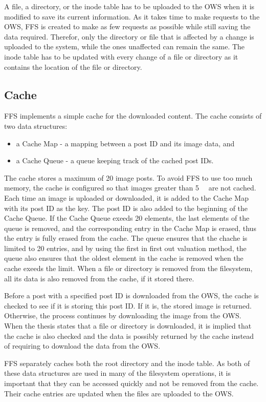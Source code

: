 A file, a directory, or the inode table has to be uploaded to the OWS when it is modified to save its current information. As it takes time to make requests to the OWS, FFS is created to make as few requests as possible while still saving the data required. Therefor, only the directory or file that is affected by a change is uploaded to the system, while the ones unaffected can remain the same. The inode table has to be updated with every change of a file or directory as it contains the location of the file or directory.

\subsection{Cache}
FFS implements a simple cache for the downloaded content. The cache consists of two data structures: 
\begin{itemize}
	\item a Cache Map - a mapping between a post ID and its image data, and
	\item a Cache Queue - a queue keeping track of the cached post IDs.
\end{itemize}
The cache stores a maximum of 20 image posts. To avoid FFS to use too much memory, the cache is configured so that images greater than \SI{5}{\mega\byte} are not cached. Each time an image is uploaded or downloaded, it is added to the Cache Map with its post ID as the key. The post ID is also added to the beginning of the Cache Queue. If the Cache Queue exeeds 20 elements, the last elements of the queue is removed, and the corresponding entry in the Cache Map is erased, thus the entry is fully erased from the cache. The queue ensures that the chache is limited to 20 entries, and by using the first in first out valuation method, the queue also ensures that the oldest element in the cache is removed when the cache exeeds the limit. When a file or directory is removed from the filesystem, all its data is also removed from the cache, if it stored there.

Before a post with a specified post ID is downloaded from the OWS, the cache is checked to see if it is storing this post ID. If it is, the stored image is returned. Otherwise, the process continues by downloading the image from the OWS. When the thesis states that a file or directory is downloaded, it is implied that the cache is also checked and the data is possibly returned by the cache instead of requiring to download the data from the OWS.

FFS separately caches both the root directory and the inode table. As both of these data structures are used in many of the filesystem operations, it is important that they can be accessed quickly and not be removed from the cache. Their cache entries are updated when the files are uploaded to the OWS.

